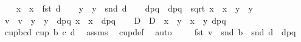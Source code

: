 \begin{isabellebody}
\ \ \isamarkupfalse%
\ x{}\ \ {\isachardoublequoteopen}x{}\ {\isasymequiv}\ fst\ d{\isachardoublequoteclose}\isanewline
\ \ \isamarkupfalse%
\ y{}\ \ {\isachardoublequoteopen}y{}\ {\isasymequiv}\ snd\ d{\isachardoublequoteclose}\isanewline
\ \ \isamarkupfalse%
\ dpq\ \ {\isachardoublequoteopen}dpq\ {\isasymequiv}\ sqrt\ {\isacharparenleft}{\kern0pt}{\isacharparenleft}{\kern0pt}x{}\ {\isacharminus}{\kern0pt}\ x{}{\isacharparenright}{\kern0pt}{\isacharcircum}{\kern0pt}{}\ {\isacharplus}{\kern0pt}\ {\isacharparenleft}{\kern0pt}y{}\ {\isacharminus}{\kern0pt}\ y{}{\isacharparenright}{\kern0pt}{\isacharcircum}{\kern0pt}{}{\isacharparenright}{\kern0pt}{\isachardoublequoteclose}\isanewline
\ \ \isamarkupfalse%
\ v\ \ {\isachardoublequoteopen}v\ {\isasymequiv}\ {\isacharparenleft}{\kern0pt}{\isacharparenleft}{\kern0pt}y{}\ {\isacharminus}{\kern0pt}\ y{}{\isacharparenright}{\kern0pt}\ {\isacharslash}{\kern0pt}\ dpq{\isacharcomma}{\kern0pt}\ {\isacharparenleft}{\kern0pt}x{}\ {\isacharminus}{\kern0pt}\ x{}{\isacharparenright}{\kern0pt}\ {\isacharslash}{\kern0pt}\ dpq{\isacharparenright}{\kern0pt}{\isachardoublequoteclose}\isanewline
\ \ \isamarkupfalse%
\ D\ \ {\isachardoublequoteopen}D\ {\isasymequiv}\ {\isacharparenleft}{\kern0pt}x{}\ {\isacharasterisk}{\kern0pt}\ y{}\ {\isacharminus}{\kern0pt}\ x{}\ {\isacharasterisk}{\kern0pt}\ y{}{\isacharparenright}{\kern0pt}{\isacharslash}{\kern0pt}\ dpq{\isachardoublequoteclose}\isanewline
\isanewline
\ \ \isamarkupfalse%
\ cup{\isacharunderscore}{\kern0pt}bcd{\isacharcolon}{\kern0pt}\ {\isachardoublequoteopen}cup{}\ b\ c\ d{\isachardoublequoteclose}\ \isamarkupfalse%
\ assms\ \isamarkupfalse%
\ cup{\isacharunderscore}{\kern0pt}def\ \isamarkupfalse%
\ auto\isanewline
\ \ \isamarkupfalse%
\ {}{\isacharcolon}{\kern0pt}\ {\isachardoublequoteopen}fst\ v\ {\isacharequal}{\kern0pt}\ {\isacharparenleft}{\kern0pt}snd\ b\ {\isacharminus}{\kern0pt}\ snd\ d{\isacharparenright}{\kern0pt}\ {\isacharslash}{\kern0pt}\ dpq{\isachardoublequoteclose}\ \isamarkupfalse%

\end{isabellebody}
